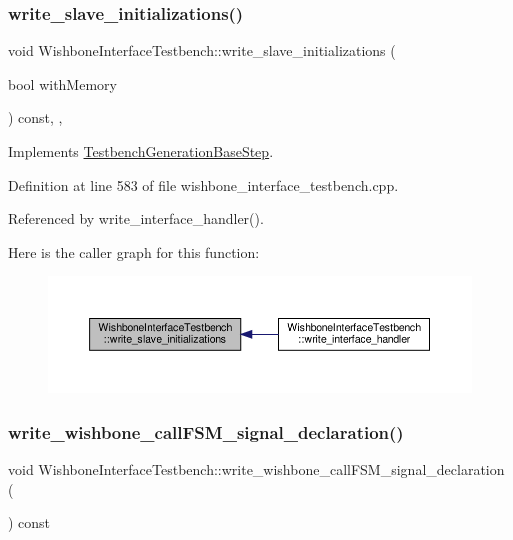 \subsubsection{\texorpdfstring{write\+\_\+slave\+\_\+initializations()}{write\_slave\_initializations()}}
{\footnotesize\ttfamily void Wishbone\+Interface\+Testbench\+::write\+\_\+slave\+\_\+initializations (\begin{DoxyParamCaption}\item[{bool}]{with\+Memory }\end{DoxyParamCaption}) const\hspace{0.3cm}{\ttfamily [override]}, {\ttfamily [protected]}, {\ttfamily [virtual]}}



Implements \hyperlink{classTestbenchGenerationBaseStep_ae67ccd4b5e09cbd14bd2218330161d3e}{Testbench\+Generation\+Base\+Step}.



Definition at line 583 of file wishbone\+\_\+interface\+\_\+testbench.\+cpp.



Referenced by write\+\_\+interface\+\_\+handler().

Here is the caller graph for this function\+:
\nopagebreak
\begin{figure}[H]
\begin{center}
\leavevmode
\includegraphics[width=350pt]{de/ded/classWishboneInterfaceTestbench_ae87e0398c62bdaa30f68d492a07e7cdc_icgraph}
\end{center}
\end{figure}
\mbox{\label{classWishboneInterfaceTestbench_ac178e39ecf9b0c3a17d65dcb7e07ba60}} 
\subsubsection{\texorpdfstring{write\+\_\+wishbone\+\_\+call\+F\+S\+M\+\_\+signal\+\_\+declaration()}{write\_wishbone\_callFSM\_signal\_declaration()}}
{\footnotesize\ttfamily void Wishbone\+Interface\+Testbench\+::write\+\_\+wishbone\+\_\+call\+F\+S\+M\+\_\+signal\+\_\+declaration (\begin{DoxyParamCaption}{ }\end{DoxyParamCaption}) const\hspace{0.3cm}{\ttfamily [protected]}}



